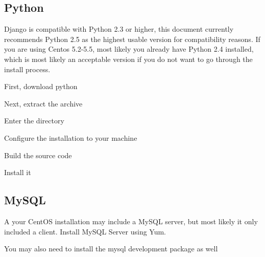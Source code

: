 
\subsection{Python}
Django is compatible with Python 2.3 or higher, this document currently recommends Python 2.5 as the highest usable version for compatibility reasons.  If you are using Centos 5.2-5.5, most likely you already have Python 2.4 installed, which is most likely an acceptable version if you do not want to go through the install process.

\vspace{1pc}

First, download python


\vspace{1pc}

Next, extract the archive


\vspace{1pc}

Enter the directory


\vspace{1pc}

Configure the installation to your machine


\vspace{1pc}

Build the source code


\vspace{1pc}

Install it


\subsection{MySQL}
A your CentOS installation may include a MySQL server, but most likely it only included a client.  Install MySQL Server using Yum.


\vspace{1pc}

You may also need to install the mysql development package as well

